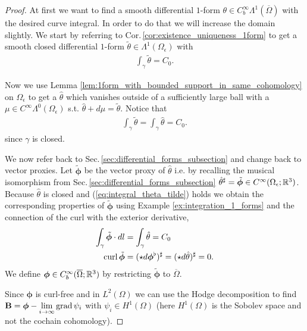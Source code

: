 \documentclass[../master_thesis.tex]{subfiles}
\begin{document}
\begin{proof}
    At first we want to find a smooth differential $1$-form 
    $\theta \in C_b^\infty\Lambda^1(\overline{\Omega})$ with the desired curve integral. 
    In order to do that we will increase the 
    domain slightly.
    We start by referring to Cor.\,\ref{cor:existence_uniqueness_1form} 
    to get a smooth closed differential $1$-form 
    $\tilde{\theta} \in \Lambda^1(\Omega_\epsilon)$ with 
    \begin{align}
        \int_\gamma \tilde{\theta} = C_0. \label{eq:integral_theta_tilde}
    \end{align}

    Now we use Lemma \ref{lem:1form_with_bounded_support_in_same_cohomology} 
    on $\Omega_\epsilon$ to get a $\hat{\theta}$ which vanishes 
    outside of a sufficiently large ball with a $\mu \in C^\infty\Lambda^0 (\Omega_\epsilon)$ s.t. 
    $\hat{\theta} + d\mu= \tilde{\theta}$. Notice that
    \begin{align*}
        \int_\gamma \tilde{\theta} = \int_\gamma \hat{\theta} = C_0. 
    \end{align*}
    since $\gamma$ is closed. 
    
    We now refer back to Sec.\,\ref{sec:differential_forms_subsection} 
    and change back to vector proxies. Let 
    $\tilde{\bm{\phi}}$ be the vector proxy of $\hat{\theta}$ 
    i.e. by recalling the musical isomorphism from Sec.\,\ref{sec:differential_forms_subsection}
     $\hat{\theta}^\sharp = \tilde{\bm{\phi}} \in C^\infty(\Omega_\epsilon;\mathbb{R}^3)$.
    Because $\hat{\theta}$ is closed and (\ref{eq:integral_theta_tilde}) holds
    we obtain the corresponding properties 
    of $\tilde{\bm{\phi}}$ using Example \ref{ex:integration_1_forms} and the connection 
    of the curl with the exterior derivative,
    \begin{align*}
        \int_\gamma \tilde{\bm{\phi}} \cdot dl &= \int_\gamma \hat{\theta} = C_0 
        \\ \operatorname{curl} \tilde{\bm{\phi}} &= (\star d\boldsymbol{\bm{\phi}}^\flat)^\sharp = 
        (\star d\hat{\theta})^\sharp = 0.
    \end{align*}
    We define $\bm{\phi} \in C_b^\infty(\overline{\Omega};\mathbb{R}^3)$ by restricting $\tilde{\bm{\phi}}$ 
    to $\overline{\Omega}$. 

    Since $\bm{\phi}$ is curl-free and in $L^2(\Omega)$ we can use the Hodge decomposition to find 
    $\mathbf{B} = \bm{\phi} - \lim\limits_{i\rightarrow \infty}\operatorname{grad} \psi_i$ 
    with $\psi_i \in H^1(\Omega)$ (here $H^1(\Omega)$ is the Sobolev space and not the cochain 
    cohomology).


\end{proof}
\end{document}
